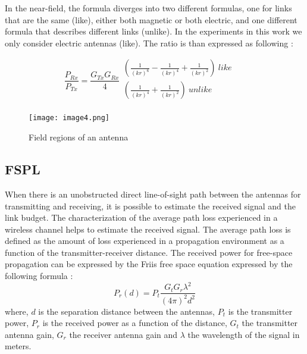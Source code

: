 In the near-field, the formula diverges into two different formulas, one for links that are the same (like), either both magnetic or both electric, and one different formula that describes different links (unlike). In the experiments in this work we only consider electric antennas (like). The ratio is than expressed as following \cite{schantz}:

\begin{equation} \label{eq:near}
\frac{P_{Rx}}{P_{Tx}}=\frac{G_{Tx}G_{Rx}}{4} \begin{array}{c}
	 \left( \frac{1}{ \left( kr \right) ^{6}}-\frac{1}{ \left( kr \right) ^{4}}+\frac{1}{ \left( kr \right) ^{2}} \right) ~like~\\
	 \left( \frac{1}{ \left( kr \right) ^{4}}+\frac{1}{ \left( kr \right) ^{2}} \right) ~unlike\\
	\end{array} \quad %
\end{equation}

%
\begin{figure}[H]
\centering
\texttt{[image: image4.png]}
\caption{\label{regions} Field regions of an antenna \cite{balanis}}
\end{figure}




\subsection{\acf{FSPL}}
When there is an unobstructed direct line-of-sight path between the antennas for transmitting and receiving, it is possible to estimate the received signal and the link budget. The characterization of the average path loss experienced in a wireless channel helps to estimate the received signal. The average path loss is defined as the amount of loss experienced in a propagation environment as a function of the transmitter-receiver distance. The received power for free-space propagation can be expressed by the Friis free space equation expressed by the following formula \cite{schantz}:
\begin{equation}
P_{r} \left( d \right) = P_{t}\frac{G_{t}G_{r} \lambda ^{2}}{ \left( 4 \pi  \right) ^{2}d^{2}} 
\end{equation}
where, $d$ is the separation distance between the antennas,  $P_{t}$ is the transmitter power, $P_{r}$ is the received power as a function of the distance, $G_{t}$ the transmitter antenna gain, $G_{r}$ the receiver antenna gain and $\lambda$ the wavelength of the signal in meters. \\


